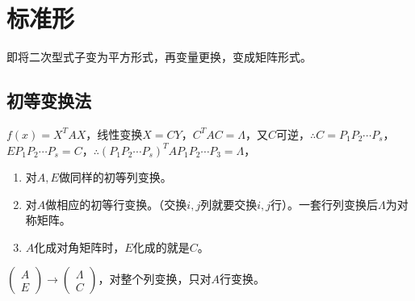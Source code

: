 \documentclass[UTF8, 12pt]{ctexart}
\begin{document}
\section{标准形}

即将二次型式子变为平方形式，再变量更换，变成矩阵形式。

\subsection{初等变换法}

$f(x)=X^TAX$，线性变换$X=CY$，$C^TAC=\Lambda$，又$C$可逆，$\therefore C=P_1P_2\cdots P_s$，$EP_1P_2\cdots P_s=C$，$\therefore(P_1P_2\cdots P_s)^TAP_1P_2\cdots P_3=\Lambda$，

\begin{enumerate}
    \item 对$A,E$做同样的初等列变换。
    \item 对$A$做相应的初等行变换。（交换$i,j$列就要交换$i,j$行）。一套行列变换后$\Lambda$为对称矩阵。
    \item $A$化成对角矩阵时，$E$化成的就是$C$。
\end{enumerate}

$\left(\begin{array}{c}
    A \\
    E
\end{array}\right)\rightarrow\left(\begin{array}{c}
    \Lambda \\
    C
\end{array}\right)$，对整个列变换，只对$A$行变换。
\end{document}
